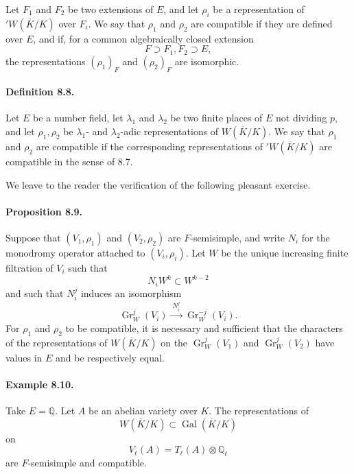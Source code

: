 \documentclass[10pt,letterpaper]{article}
\newcommand{\Q}{\mathbb Q}
\newcommand{\Gal}{\operatorname{Gal}}
\providecommand{\Gal}{\operatorname{Gal}}
\providecommand{\Gr}{\operatorname{Gr}}
\providecommand{\Gal}{\operatorname{Gal}}
\providecommand{\Gal}{\operatorname{Gal}}
\providecommand{\Gal}{\operatorname{Gal}}
\begin{document}
Let \(F_1\) and \(F_2\) be two extensions of \(E\), and let \(\rho_i\) be a representation of \({}'W(\overline K/K)\) over \(F_i\). We say that \(\rho_1\) and \(\rho_2\) are compatible if they are defined over \(E\), and if, for a common algebraically closed extension
\[
F\supset F_1,F_2\supset E,
\]
the representations \((\rho_1)_F\) and \((\rho_2)_F\) are isomorphic.

\paragraph{Definition 8.8.} Let $E$ be a number field, let $\lambda_1$ and $\lambda_2$ be two finite places of $E$ not dividing $p$, and let $\rho_1,\rho_2$ be $\lambda_1$- and $\lambda_2$-adic representations of $W(\overline K/K)$. We say that $\rho_1$ and $\rho_2$ are compatible if the corresponding representations of ${}'W(\overline K/K)$ are compatible in the sense of 8.7.

We leave to the reader the verification of the following pleasant exercise.

\paragraph{Proposition 8.9.} Suppose that $(V_1,\rho_1)$ and $(V_2,\rho_2)$ are $F$-semisimple, and write $N_i$ for the monodromy operator attached to $(V_i,\rho_i)$. Let $W$ be the unique increasing finite filtration of $V_i$ such that
\[
N_i W^k\subset W^{k-2}
\]
and such that $N_i^j$ induces an isomorphism
\[
\Gr_W^j(V_i)\xrightarrow{\;N_i^j\;}\Gr_W^{-j}(V_i).
\]
For $\rho_1$ and $\rho_2$ to be compatible, it is necessary and sufficient that the characters of the representations of $W(\overline K/K)$ on the $\Gr_W^j(V_1)$ and $\Gr_W^j(V_2)$ have values in $E$ and be respectively equal.

\paragraph{Example 8.10.} Take $E=\Q$. Let $A$ be an abelian variety over $K$. The representations of
\[
W(\overline K/K)\subset\Gal(\overline K/K)
\]
on
\[
V_\ell(A)=T_\ell(A)\otimes\Q_\ell
\]
are $F$-semisimple and compatible.
\end{document}
